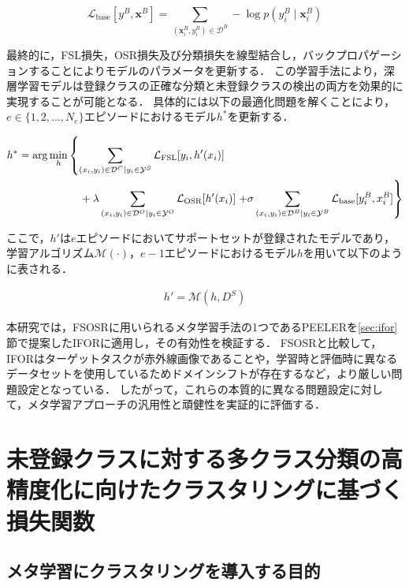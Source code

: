 \begin{equation}
  \mathcal{L}_{\mathrm{base}} [y^B, \bm{x}^B] = \sum_{(\bm{x}^B_i,y^B_i) \in \mathcal{D}^B} - \log {p(y^B_i \mid \bm{x}^B_i)}
\end{equation}

最終的に，FSL損失，OSR損失及び分類損失を線型結合し，バックプロパゲーションすることによりモデルのパラメータを更新する．
この学習手法により，深層学習モデルは登録クラスの正確な分類と未登録クラスの検出の両方を効果的に実現することが可能となる．
具体的には以下の最適化問題を解くことにより，$e \in \{1, 2, \ldots, N_e\}$エピソードにおけるモデル$h^*$を更新する．

\begin{align}
  h^* & = \arg \min_h \left\{ \sum_{(x_i,y_i) \in \mathcal{D}^C|y_i \in \mathcal{Y}^S}{\mathcal{L}_{\mathrm{FSL}}[y_i,h'(x_i)]} \right. \nonumber \\
      & \hspace{20mm} + \lambda \sum_{(x_i,y_i) \in \mathcal{D}^O|y_i \in \mathcal{Y}^O}{\mathcal{L}_{\mathrm{OSR}}[h'(x_i)]}
        \left. + \sigma \sum_{(x_i,y_i) \in \mathcal{D}^B|y_i \in \mathcal{Y}^B}{\mathcal{L}_{\mathrm{base}}[y^B_i,x^B_i]} \right\}
\end{align}

\noindent
ここで，$h'$は$e$エピソードにおいてサポートセットが登録されたモデルであり，
学習アルゴリズム$\mathcal{M}(\cdot)$，$e-1$エピソードにおけるモデル$h$を用いて以下のように表される．

\begin{align}
  h' = \mathcal{M}(h, D^S)
\end{align}

本研究では，FSOSRに用いられるメタ学習手法の1つであるPEELERを\ref{sec:ifor}節で提案したIFORに適用し，その有効性を検証する．
FSOSRと比較して，IFORはターゲットタスクが赤外線画像であることや，学習時と評価時に異なるデータセットを使用しているためドメインシフトが存在するなど，より厳しい問題設定となっている．
したがって，これらの本質的に異なる問題設定に対して，メタ学習アプローチの汎用性と頑健性を実証的に評価する．

\section{未登録クラスに対する多クラス分類の高精度化に向けたクラスタリングに基づく損失関数}

\subsection{メタ学習にクラスタリングを導入する目的}
\label{subsec:purpose}

